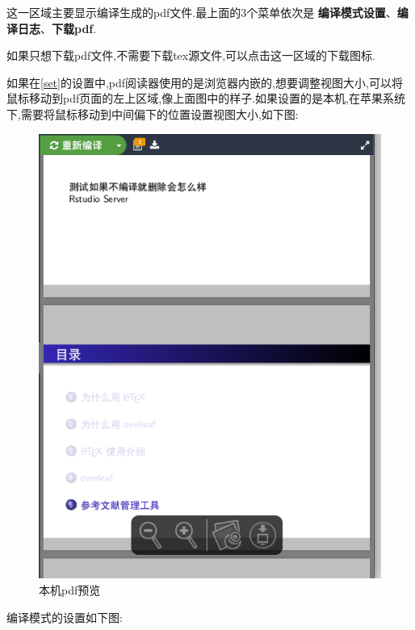\documentclass[]{ctexbook}
\begin{document}
这一区域主要显示编译生成的pdf文件.最上面的3个菜单依次是 \textbf{编译模式设置}、\textbf{编译日志}、\textbf{下载pdf}.

如果只想下载pdf文件,不需要下载tex源文件,可以点击这一区域的下载图标.

如果在\ref{set}的设置中,pdf阅读器使用的是浏览器内嵌的,想要调整视图大小,可以将鼠标移动到pdf页面的左上区域,像上面图中的样子.如果设置的是本机,在苹果系统下,需要将鼠标移动到中间偏下的位置设置视图大小,如下图:

\begin{figure}
\centering
\includegraphics{figure/localpdf.png}
\caption{本机pdf预览}
\end{figure}

编译模式的设置如下图:
\end{document}
